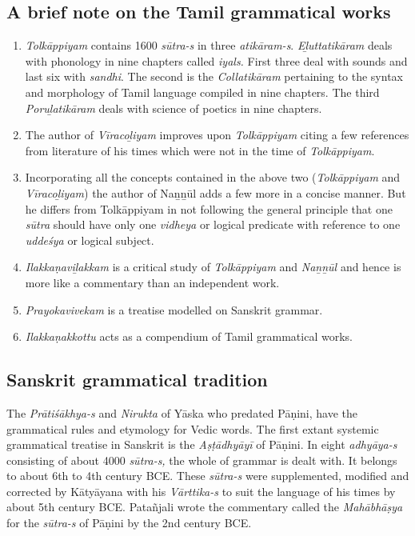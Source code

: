 \subsection*{A brief note on the Tamil grammatical works}

\begin{enumerate}[{\rm 1)}]
\itemsep=0pt
\item \textit{Tolkāppiyam} contains 1600 \textit{sūtra-s} in three \textit{atikāram-s}. \textit{Eḻuttatikāram} deals with phonology in nine chapters called \textit{iyals.} First three deal with sounds and last six with \textit{sandhi}. The second is the \textit{Collatikāram} pertaining to the syntax and morphology of Tamil language compiled in nine chapters. The third \textit{Poruḻatikāram} deals with science of poetics in nine chapters.

 \item The author of \textit{Vīracoḻiyam} improves upon \textit{Tolkāppiyam} citing a few references from literature of his times which were not in the time of \textit{Tolkāppiyam}.

 \item Incorporating all the concepts contained in the above two (\textit{Tolkāppiyam} and \textit{Vīracoḻiyam}) the author of Naṉṉūl adds a few more in a concise manner. But he differs from Tolkāppiyam in not following the general principle that one \textit{sūtra} should have only one \textit{vidheya} or logical predicate with reference to one \textit{uddeśya} or logical subject.

 \item \textit{Ilakkaṇaviḻakkam} is a critical study of \textit{Tolkāppiyam} and \textit{Naṉṉūl} and hence is more like a commentary than an independent work.

 \item \textit{Prayokavivekam} is a treatise modelled on Sanskrit grammar.

 \item \textit{Ilakkaṇakkottu} acts as a compendium of Tamil grammatical works.

\end{enumerate}


\subsection*{Sanskrit grammatical tradition}

The \textit{Prātiśākhya-s} and \textit{Nirukta} of Yāska who predated Pāṇini, have the grammatical rules and etymology for Vedic words. The first extant systemic grammatical treatise in Sanskrit is the \textit{Aṣṭādhyāyī} of Pāṇini. In eight \textit{adhyāya-s} consisting of about 4000 \textit{sūtra-s,} the whole of grammar is dealt with. It belongs to about 6th to 4th century BCE. These \textit{sūtra-s} were supplemented, modified and corrected by Kātyāyana with his \textit{Vārttika-s} to suit the language of his times by about 5th century BCE. Patañjali wrote the commentary called the \textit{Mahābhāṣya} for the \textit{sūtra-s} of Pāṇini by the 2nd century BCE.


